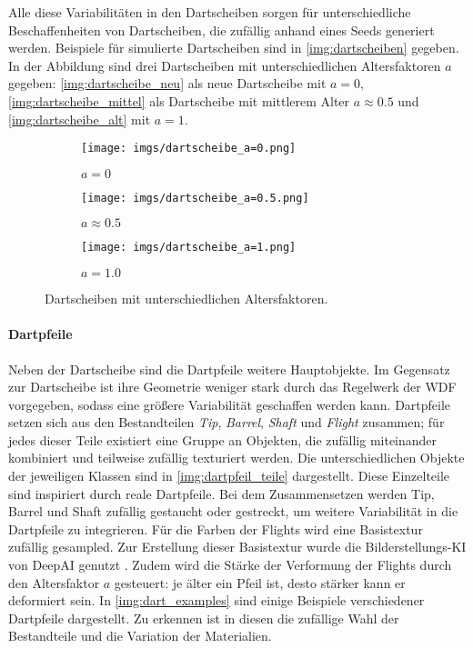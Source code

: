 Alle diese Variabilitäten in den Dartscheiben sorgen für unterschiedliche Beschaffenheiten von Dartscheiben, die zufällig anhand eines Seeds generiert werden. Beispiele für simulierte Dartscheiben sind in \autoref{img:dartscheiben} gegeben. In der Abbildung sind drei Dartscheiben mit unterschiedlichen Altersfaktoren $a$ gegeben: \autoref{img:dartscheibe_neu} als neue Dartscheibe mit $a=0$, \autoref{img:dartscheibe_mittel} als Dartscheibe mit mittlerem Alter $a\approx0.5$ und \autoref{img:dartscheibe_alt} mit $a=1$.

\begin{figure}
    \centering
    \begin{subfigure}{0.3\textwidth}
        \centering
        \texttt{[image: imgs/dartscheibe\_a=0.png]}
        \caption{$a=0$}
        \label{img:dartscheibe_neu}
    \end{subfigure}
    \hfill
    \begin{subfigure}{0.3\textwidth}
        \centering
        \texttt{[image: imgs/dartscheibe\_a=0.5.png]}
        \caption{$a\approx0.5$}
        \label{img:dartscheibe_mittel}
    \end{subfigure}
    \hfill
    \begin{subfigure}{0.3\textwidth}
        \centering
        \texttt{[image: imgs/dartscheibe\_a=1.png]}
        \caption{$a=1.0$}
        \label{img:dartscheibe_alt}
    \end{subfigure}
    \caption{Dartscheiben mit unterschiedlichen Altersfaktoren.}
    \label{img:dartscheiben}
\end{figure}

\paragraph{Dartpfeile}
\label{sec:impl:daten:blender:hauptobjekte:dartpfeile}

Neben der Dartscheibe sind die Dartpfeile weitere Hauptobjekte. Im Gegensatz zur Dartscheibe ist ihre Geometrie weniger stark durch das Regelwerk der \ac{WDF} vorgegeben, sodass eine größere Variabilität geschaffen werden kann. Dartpfeile setzen sich aus den Bestandteilen \textit{Tip}, \textit{Barrel}, \textit{Shaft} und \textit{Flight} zusammen; für jedes dieser Teile existiert eine Gruppe an Objekten, die zufällig miteinander kombiniert und teilweise zufällig texturiert werden. Die unterschiedlichen Objekte der jeweiligen Klassen sind in \autoref{img:dartpfeil_teile} dargestellt. Diese Einzelteile sind inspiriert durch reale Dartpfeile. Bei dem Zusammensetzen werden Tip, Barrel und Shaft zufällig gestaucht oder gestreckt, um weitere Variabilität in die Dartpfeile zu integrieren. Für die Farben der Flights wird eine Basistextur zufällig gesampled. Zur Erstellung dieser Basistextur wurde die Bilderstellungs-KI von DeepAI genutzt \cite{deepai-image}. Zudem wird die Stärke der Verformung der Flights durch den Altersfaktor $a$ gesteuert: je älter ein Pfeil ist, desto stärker kann er deformiert sein. In \autoref{img:dart_examples} sind einige Beispiele verschiedener Dartpfeile dargestellt. Zu erkennen ist in diesen die zufällige Wahl der Bestandteile und die Variation der Materialien.

